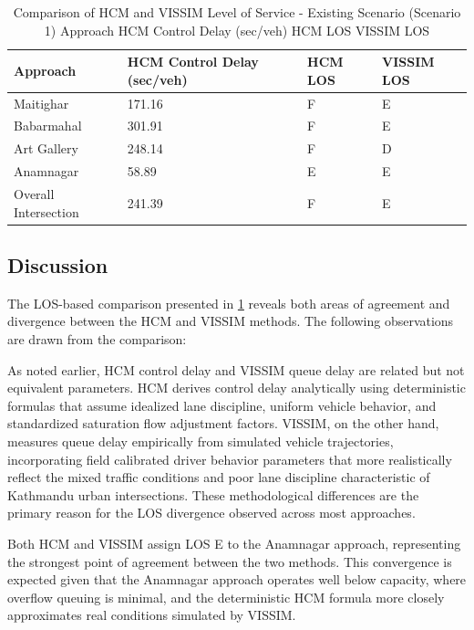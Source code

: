 \begin{table}[h!]
   \centering
   \caption{Comparison of HCM and VISSIM Level of Service - Existing Scenario (Scenario 1)
Approach HCM Control Delay (sec/veh)	HCM LOS	VISSIM LOS}
   \begin{tabular}{|l|p{3.8cm}|l|l|}
      \hline
      Approach &	HCM Control Delay (sec/veh) & HCM LOS & VISSIM LOS\\
      \hline
      Maitighar &	171.16 & F & E \\
      \hline
      Babarmahal & 301.91	& F &E \\
      \hline
      Art Gallery	 &248.14 &	F & D \\
      \hline
      Anamnagar & 58.89 & E &	E\\
      \hline
      Overall Intersection & 241.39	& F & E \\
      \hline
   \end{tabular}
   \label{tab:hcmvissim}
\end{table}
\pagebreak
    

\subsection{Discussion}

The LOS-based comparison presented in \cref{tab:hcmvissim} reveals 
both areas of agreement and divergence between the HCM 
and VISSIM methods. The following observations are drawn 
from the comparison:

As noted earlier, HCM control delay and VISSIM queue delay 
are related but not equivalent parameters. HCM derives 
control delay analytically using deterministic formulas 
that assume idealized lane discipline, uniform vehicle 
behavior, and standardized saturation flow adjustment 
factors. VISSIM, on the other hand, measures queue delay 
empirically from simulated vehicle trajectories, 
incorporating field calibrated driver behavior parameters 
that more realistically reflect the mixed traffic 
conditions and poor lane discipline characteristic of 
Kathmandu urban intersections. These methodological 
differences are the primary reason for the LOS divergence 
observed across most approaches.

Both HCM and VISSIM assign LOS E to the Anamnagar approach, 
representing the strongest point of agreement between 
the two methods. This convergence is expected given that 
the Anamnagar approach operates well below capacity, 
where overflow queuing is minimal, and the deterministic 
HCM formula more closely approximates real conditions 
simulated by VISSIM.

